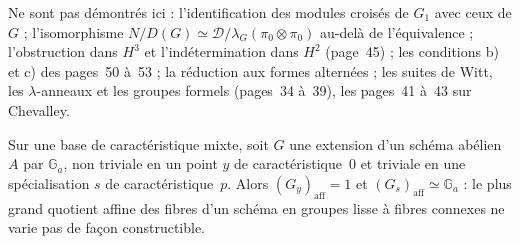 Ne sont pas démontrés ici : l'identification des modules croisés de $G_1$ avec ceux de $G$ ; l'isomorphisme $N/D(G) \simeq \mathcal D/\lambda_G(\pi_0\otimes\pi_0)$ au-delà de l'équivalence ; l'obstruction dans $H^3$ et l'indétermination dans $H^2$ (page~45) ; les conditions b) et c) des pages~50 à~53 ; la réduction aux formes alternées ; les suites de Witt, les $\lambda$-anneaux et les groupes formels (pages~34 à~39), les pages~41 à~43 sur Chevalley.

\begin{encadre}
\begin{exemple}\nonverifie
Sur une base de caractéristique mixte, soit $G$ une extension d'un schéma abélien $A$ par $\mathbb G_a$, non triviale en un point $y$ de caractéristique~$0$ et triviale en une spécialisation $s$ de caractéristique~$p$. Alors $(G_y)_{\mathrm{aff}} = 1$ et $(G_s)_{\mathrm{aff}} \simeq \mathbb G_a$ : le plus grand quotient affine des fibres d'un schéma en groupes lisse à fibres connexes ne varie pas de façon constructible.
\end{exemple}
\end{encadre}
